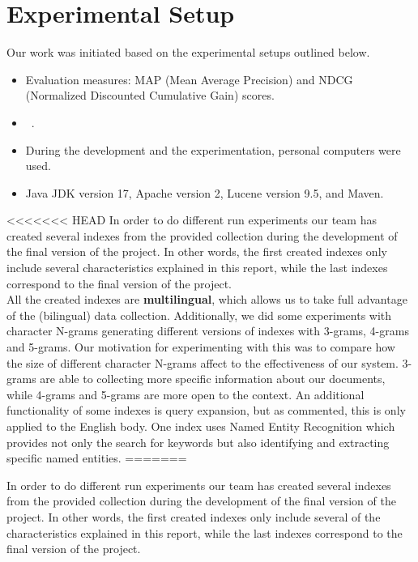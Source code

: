 \section{Experimental Setup}\label{sec:setup}

Our work was initiated based on the experimental setups outlined below.
\begin{itemize}
	\item Evaluation measures: MAP (Mean Average Precision) and NDCG (Normalized Discounted Cumulative Gain) scores.
	\item~\citep[Repository]{jihuming}.
	\item During the development and the experimentation, personal computers were used.
	\item Java JDK version 17, Apache version 2, Lucene version 9.5, and Maven.
\end{itemize}
<<<<<<< HEAD
In order to do different run experiments our team has created several indexes from the provided collection during the development of the final version of the project. In other words, the first created indexes only include several characteristics explained in this report, while the last indexes correspond to the final version of the project.\\
All the created indexes are \textbf{multilingual}, which allows us to take full advantage of the (bilingual) data collection. Additionally, we did some experiments with character N-grams generating different versions of indexes with 3-grams, 4-grams and 5-grams. Our motivation for experimenting with this was to compare how the size of different character N-grams affect to the effectiveness of our system. 3-grams are able to collecting more specific information about our documents, while 4-grams and 5-grams are more open to the context. An additional functionality of some indexes is query expansion, but as commented, this is only applied to the English body. One index uses Named Entity Recognition which provides not only the search for keywords but also identifying and extracting specific named entities.
=======

In order to do different run experiments our team has created several indexes from the provided collection during the
development of the final version of the project.
In other words, the first created indexes only include several of the characteristics explained in this report, while
the last indexes correspond to the final version of the project.\\

